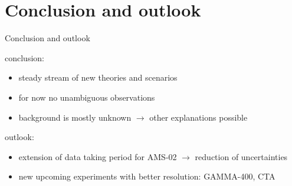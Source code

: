 \documentclass[11pt,a4paper,titlepage]{beamer}
\begin{document}
\section{Conclusion and outlook}
\begin{frame}{Conclusion and outlook}
\begin{minipage}{0.42\textwidth}
conclusion:
\begin{itemize}
\item steady stream of new theories and scenarios\medskip
\item for now no unambiguous observations\medskip
\item background is mostly unknown $\rightarrow$ other explanations possible 
\end{itemize}
\end{minipage}
\begin{minipage}{0.57\textwidth}
\end{minipage}\vfill
\begin{minipage}{\textwidth}
outlook:
\begin{itemize}
\item extension of data taking period for AMS-02 $\rightarrow$ reduction of uncertainties\medskip
\item new upcoming experiments with better resolution: GAMMA-400, CTA
\end{itemize}
\end{minipage}
\end{frame}
\end{document}
